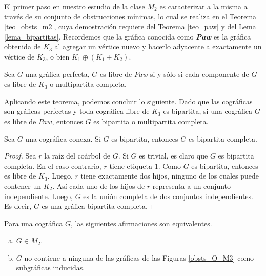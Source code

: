 El primer paso en nuestro estudio de la clase $M_2$ es caracterizar a la
misma a través de su conjunto de obstrucciones mínimas, lo cual se realiza 
en el Teorema \ref{teo_obsts_m2}, cuya demostración requiere del Teorema
\ref{teo_paw} y del Lema \ref{lema_bipartitas}. Recordemos que
la gr\'afica conocida como \textbf{\emph{Paw}} es la gr\'afica obtenida de
$K_3$ al agregar un v\'ertice nuevo y hacerlo adyacente a exactamente un
v\'ertice de $K_3$, o bien $K_1 \oplus (K_1 + K_2)$.

\begin{theorem}
	Sea $G$ una gráfica perfecta, $G$ es libre de $Paw$ si y sólo si cada componente de $G$ es libre de $K_3$ o multipartita completa.
\end{theorem}

Aplicando este teorema, podemos concluir lo siguiente. Dado que las cográficas son gráficas perfectas y toda cográfica libre de $K_3$ es bipartita, si una cográfica $G$ es libre de $Paw$, entonces $G$ es bipartita o multipartita completa.

\begin{lemma}
Sea $G$ una cográfica conexa. Si $G$ es bipartita, entonces $G$ es bipartita completa.
\end{lemma}

\begin{proof}
Sea $r$ la raíz del coárbol de $G$. Si $G$ es trivial, es claro que $G$ es bipartita completa. En el caso contrario, $r$ tiene etiqueta 1. Como $G$ es bipartita, entonces es libre de $K_3$. Luego, $r$ tiene exactamente dos hijos, ninguno de los cuales puede contener un $K_2$. Así cada uno de los hijos de $r$ representa a un conjunto independiente. Luego, $G$ es la unión completa de dos conjuntos independientes. Es decir, $G$ es una gráfica bipartita completa.
\end{proof}

\begin{theorem} \label{teo_obsts_m2}

    Para una cográfica $G$, las siguientes afirmaciones son equivalentes.
    \begin{enumerate}[(a)]
        \item $G \in M_2$.
        \item $G$ no contiene a ninguna de las gráficas de las Figuras \ref{obsts_O_M3} como subgráficas inducidas.
    \end{enumerate}

\end{theorem}

